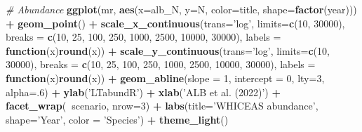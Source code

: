 \documentclass[
]{book}
\newenvironment{Shaded}{\begin{snugshade}}{\end{snugshade}}
\newcommand{\CommentTok}[1]{\textcolor[rgb]{0.56,0.35,0.01}{\textit{#1}}}
\newcommand{\ControlFlowTok}[1]{\textcolor[rgb]{0.13,0.29,0.53}{\textbf{#1}}}
\newcommand{\DataTypeTok}[1]{\textcolor[rgb]{0.13,0.29,0.53}{#1}}
\newcommand{\DecValTok}[1]{\textcolor[rgb]{0.00,0.00,0.81}{#1}}
\newcommand{\KeywordTok}[1]{\textcolor[rgb]{0.13,0.29,0.53}{\textbf{#1}}}
\newcommand{\NormalTok}[1]{#1}
\newcommand{\OperatorTok}[1]{\textcolor[rgb]{0.81,0.36,0.00}{\textbf{#1}}}
\newcommand{\StringTok}[1]{\textcolor[rgb]{0.31,0.60,0.02}{#1}}
\begin{document}
\begin{Shaded}
\begin{Highlighting}[]
\CommentTok{# Abundance}
\KeywordTok{ggplot}\NormalTok{(mr,}
       \KeywordTok{aes}\NormalTok{(}\DataTypeTok{x=}\NormalTok{alb_N, }\DataTypeTok{y=}\NormalTok{N, }
           \DataTypeTok{color=}\NormalTok{title, }\DataTypeTok{shape=}\KeywordTok{factor}\NormalTok{(year))) }\OperatorTok{+}
\StringTok{    }\KeywordTok{geom_point}\NormalTok{() }\OperatorTok{+}
\StringTok{    }\KeywordTok{scale_x_continuous}\NormalTok{(}\DataTypeTok{trans=}\StringTok{'log'}\NormalTok{, }
                       \DataTypeTok{limits=}\KeywordTok{c}\NormalTok{(}\DecValTok{10}\NormalTok{, }\DecValTok{30000}\NormalTok{), }
                       \DataTypeTok{breaks =} \KeywordTok{c}\NormalTok{(}\DecValTok{10}\NormalTok{, }\DecValTok{25}\NormalTok{, }\DecValTok{100}\NormalTok{, }\DecValTok{250}\NormalTok{, }\DecValTok{1000}\NormalTok{, }\DecValTok{2500}\NormalTok{, }\DecValTok{10000}\NormalTok{, }\DecValTok{30000}\NormalTok{),}
                       \DataTypeTok{labels =} \ControlFlowTok{function}\NormalTok{(x)}\KeywordTok{round}\NormalTok{(x)) }\OperatorTok{+}
\StringTok{    }\KeywordTok{scale_y_continuous}\NormalTok{(}\DataTypeTok{trans=}\StringTok{'log'}\NormalTok{, }
                       \DataTypeTok{limits=}\KeywordTok{c}\NormalTok{(}\DecValTok{10}\NormalTok{, }\DecValTok{30000}\NormalTok{), }
                       \DataTypeTok{breaks =} \KeywordTok{c}\NormalTok{(}\DecValTok{10}\NormalTok{, }\DecValTok{25}\NormalTok{, }\DecValTok{100}\NormalTok{, }\DecValTok{250}\NormalTok{, }\DecValTok{1000}\NormalTok{, }\DecValTok{2500}\NormalTok{, }\DecValTok{10000}\NormalTok{, }\DecValTok{30000}\NormalTok{),}
                       \DataTypeTok{labels =} \ControlFlowTok{function}\NormalTok{(x)}\KeywordTok{round}\NormalTok{(x)) }\OperatorTok{+}
\StringTok{    }\KeywordTok{geom_abline}\NormalTok{(}\DataTypeTok{slope =} \DecValTok{1}\NormalTok{, }\DataTypeTok{intercept =} \DecValTok{0}\NormalTok{, }\DataTypeTok{lty=}\DecValTok{3}\NormalTok{, }\DataTypeTok{alpha=}\NormalTok{.}\DecValTok{6}\NormalTok{) }\OperatorTok{+}
\StringTok{    }\KeywordTok{ylab}\NormalTok{(}\StringTok{'LTabundR'}\NormalTok{) }\OperatorTok{+}\StringTok{ }\KeywordTok{xlab}\NormalTok{(}\StringTok{'ALB et al. (2022)'}\NormalTok{) }\OperatorTok{+}
\StringTok{  }\KeywordTok{facet_wrap}\NormalTok{(}\OperatorTok{~}\NormalTok{scenario, }\DataTypeTok{nrow=}\DecValTok{3}\NormalTok{) }\OperatorTok{+}\StringTok{ }
\StringTok{  }\KeywordTok{labs}\NormalTok{(}\DataTypeTok{title=}\StringTok{'WHICEAS abundance'}\NormalTok{, }
       \DataTypeTok{shape=}\StringTok{'Year'}\NormalTok{, }\DataTypeTok{color =} \StringTok{'Species'}\NormalTok{) }\OperatorTok{+}\StringTok{ }
\StringTok{  }\KeywordTok{theme_light}\NormalTok{()}
\end{Highlighting}
\end{Shaded}
\end{document}
